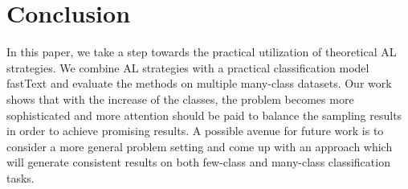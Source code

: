 \section{Conclusion}
\label{sec:conclude}
In this paper, we take a step towards the practical utilization of theoretical 
AL strategies. We combine AL strategies with a practical classification model fastText 
and evaluate the methods on multiple many-class datasets. 
Our work shows that with the increase of the classes, 
the problem becomes more sophisticated and more attention should be paid to 
balance the sampling results in order to achieve promising results. 
A possible avenue for future work is to consider a more general problem setting 
and come up with an approach which will generate consistent results on 
both few-class and many-class classification tasks.
